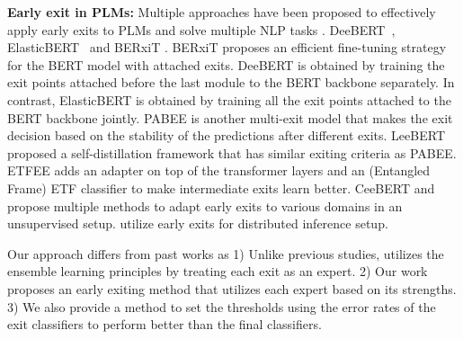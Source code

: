 \noindent \textbf{Early exit in PLMs:} 
Multiple approaches have been proposed to effectively apply early exits to PLMs and solve multiple NLP tasks \citep{liu2021elasticbert, ACL2020_Deebert, zhou2020bert, banino2021pondernet, balagansky2022palbert, sun2022simple, ji2023early}. DeeBERT~\citep{ACL2020_Deebert}, ElasticBERT~\citep{liu2021elasticbert} and BERxiT \citep{xin2021berxit}. BERxiT proposes an efficient fine-tuning strategy for the BERT model with attached exits. DeeBERT is obtained by training the exit points attached before the last module to the BERT backbone separately. In contrast, ElasticBERT is obtained by training all the exit points attached to the BERT backbone jointly. PABEE \citep{zhou2020bert} is another multi-exit model that makes the exit decision based on the stability of the predictions after different exits. LeeBERT \citep{zhu2021leebert} proposed a self-distillation framework that has similar exiting criteria as PABEE. ETFEE \citep{ji2023early} adds an adapter on top of the transformer layers and an (Entangled Frame) ETF classifier to make intermediate exits learn better. CeeBERT \citep{bajpai2024ceebert} and \citep{bajpai2024dadee} propose multiple methods to adapt early exits to various domains in an unsupervised setup. \cite{bajpai2023splitee, bajpai2024splitee} utilize early exits for distributed inference setup.
 

Our approach differs from past works as 1) Unlike previous studies, \algo{} utilizes the ensemble learning principles by treating each exit as an expert. 2) Our work proposes an early exiting method that utilizes each expert based on its strengths.  3) We also provide a method to set the thresholds using the error rates of the exit classifiers to perform better than the final classifiers.